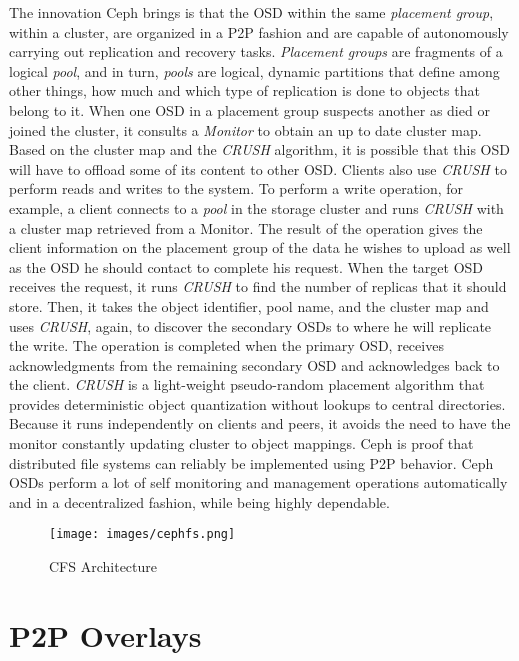 \documentclass[runningheads]{llncs}
\begin{document}
The innovation Ceph brings is that the OSD within the same \textit{placement group}, within a cluster, are organized in a P2P fashion and are capable of autonomously carrying out replication and recovery tasks. \textit{Placement groups} are fragments of a logical \textit{pool}, and in turn, \textit{pools} are logical, dynamic partitions that define among other things, how much and which type of replication is done to objects that belong to it. When one OSD in a placement group suspects another as died or joined the cluster, it consults a \textit{Monitor} to obtain an up to date cluster map. Based on the cluster map and the \textit{CRUSH}\cite{crush} algorithm, it is possible that this OSD will have to offload some of its content to other OSD. Clients also use \textit{CRUSH} to perform reads and writes to the system. To perform a write operation, for example, a client connects to a \textit{pool} in the storage cluster and runs \textit{CRUSH} with a cluster map retrieved from a Monitor. The result of the operation gives the client information on the placement group of the data he wishes to upload as well as the OSD he should contact to complete his request. When the target OSD receives the request, it runs \textit{CRUSH} to find the number of replicas that it should store. Then, it takes the object identifier, pool name, and the cluster map and uses \textit{CRUSH}, again, to discover the secondary OSDs to where he will replicate the write. The operation is completed when the primary OSD, receives acknowledgments from the remaining secondary OSD and acknowledges back to the client. \textit{CRUSH} is a light-weight pseudo-random placement algorithm that provides deterministic object quantization without lookups to central directories. Because it runs independently on clients and peers, it avoids the need to have the monitor constantly updating cluster to object mappings. Ceph is proof that distributed file systems can reliably be implemented using P2P behavior. Ceph OSDs perform a lot of self monitoring and management operations automatically and in a decentralized fashion, while being highly dependable. \cite{ceph, ceph_benchmarks}

\begin{figure}[t]
\centering
\texttt{[image: images/cephfs.png]}
\caption{CFS Architecture \cite{configure-ceph}}
\label{fig:cfs_arch}
\end{figure}

\newpage\section{P2P Overlays}
\end{document}

